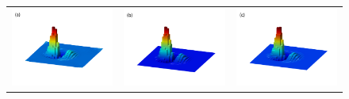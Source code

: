 \documentclass[12pt]{CSUNthesis}
\begin{document}
\begin{center}
\begin{figure}[h]
\centering
  \begin{tabular}{@{}ccc@{}}
  \includegraphics[height=.18\textheight]{images/27N_split_fourier.pdf}&
  \includegraphics[height=.18\textheight]{images/27N_split_direct.pdf}&
  \includegraphics[height=.18\textheight]{images/27N_fourier.pdf}\\

\end{tabular}
\end{figure}
\end{center}
\end{document}
